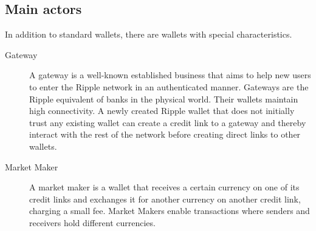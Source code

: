 \subsection{Main actors}
In addition to standard wallets, there are wallets with special characteristics.
\begin{description}
\item[Gateway] A gateway is a well-known established business that aims to help new users to enter the Ripple network in an authenticated manner. Gateways are the Ripple equivalent of banks in the physical world. Their wallets maintain high connectivity. A newly created Ripple wallet that does not initially trust any existing wallet can create a credit link to a gateway and thereby interact with the rest of the network before creating direct links to other wallets.
\item[Market Maker] A market maker is a wallet that receives a certain currency on one of its credit links and exchanges it for another currency on another credit link, charging a small fee. Market Makers enable transactions where senders and receivers hold different currencies.
\end{description}

